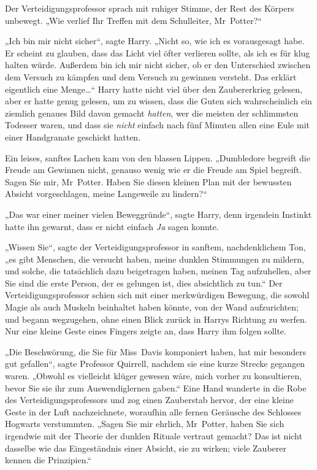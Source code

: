 {Der Verteidigungsprofessor sprach mit ruhiger Stimme, der Rest des Körpers unbewegt. „Wie verlief Ihr Treffen mit dem Schulleiter, Mr~Potter?“

„Ich bin mir nicht sicher“, sagte Harry. „Nicht so, wie ich es vorausgesagt habe. Er scheint zu glauben, dass das Licht viel öfter verlieren sollte, als ich es für klug halten würde. Außerdem bin ich mir nicht sicher, ob er den Unterschied zwischen dem Versuch zu kämpfen und dem Versuch zu gewinnen versteht. Das erklärt eigentlich eine Menge…“ Harry hatte nicht viel über den Zaubererkrieg gelesen, aber er hatte genug gelesen, um zu wissen, dass die Guten sich wahrscheinlich ein ziemlich genaues Bild davon gemacht \emph{hatten}, wer die meisten der schlimmsten Todesser waren, und dass sie \emph{nicht} einfach nach fünf Minuten allen eine Eule mit einer Handgranate geschickt hatten.

Ein leises, sanftes Lachen kam von den blassen Lippen. „Dumbledore begreift die Freude am Gewinnen nicht, genauso wenig wie er die Freude am Spiel begreift. Sagen Sie mir, Mr~Potter. Haben Sie diesen kleinen Plan mit der bewussten Absicht vorgeschlagen, meine Langeweile zu lindern?“

„Das war einer meiner vielen Beweggründe“, sagte Harry, denn irgendein Instinkt hatte ihn gewarnt, dass er nicht einfach \emph{Ja} sagen konnte.

„Wissen Sie“, sagte der Verteidigungsprofessor in sanftem, nachdenklichem Ton, „es gibt Menschen, die versucht haben, meine dunklen Stimmungen zu mildern, und solche, die tatsächlich dazu beigetragen haben, meinen Tag aufzuhellen, aber Sie sind die erste Person, der es gelungen ist, dies absichtlich zu tun.“ Der Verteidigungsprofessor schien sich mit einer merkwürdigen Bewegung, die sowohl Magie als auch Muskeln beinhaltet haben könnte, von der Wand aufzurichten; und begann wegzugehen, ohne einen Blick zurück in Harrys Richtung zu werfen. Nur eine kleine Geste eines Fingers zeigte an, dass Harry ihm folgen sollte.

„Die Beschwörung, die Sie für Miss~Davis komponiert haben, hat mir besonders gut gefallen“, sagte Professor Quirrell, nachdem sie eine kurze Strecke gegangen waren. „Obwohl es vielleicht klüger gewesen wäre, mich vorher zu konsultieren, bevor Sie sie ihr zum Auswendiglernen gaben.“ Eine Hand wanderte in die Robe des Verteidigungsprofessors und zog einen Zauberstab hervor, der eine kleine Geste in der Luft nachzeichnete, woraufhin alle fernen Geräusche des Schlosses Hogwarts verstummten. „Sagen Sie mir ehrlich, Mr~Potter, haben Sie sich irgendwie mit der Theorie der dunklen Rituale vertraut gemacht? Das ist nicht dasselbe wie das Eingeständnis einer Absicht, sie zu wirken; viele Zauberer kennen die Prinzipien.“

}
